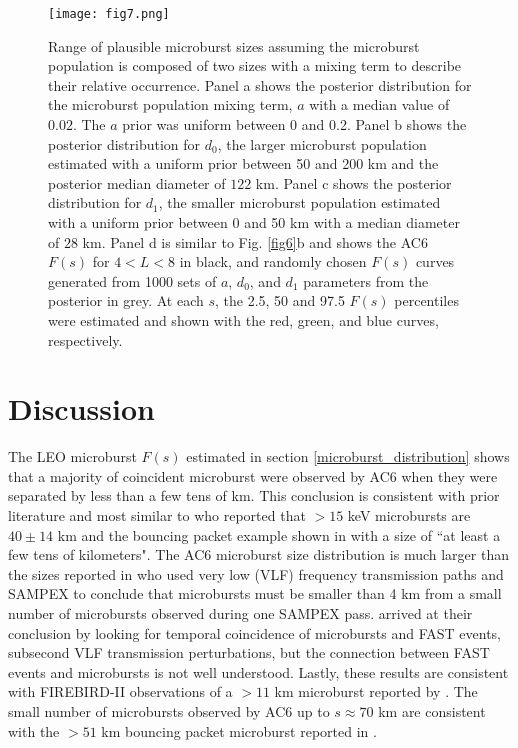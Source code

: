 \documentclass[draft]{agujournal2019}
\begin{document}
\begin{figure}
\texttt{[image: fig7.png]}
\caption{Range of plausible microburst sizes assuming the microburst population is composed of two sizes with a mixing term to describe their relative occurrence. Panel a shows the posterior distribution for the microburst population mixing term, $a$ with a median value of $0.02$. The $a$ prior was uniform between 0 and 0.2. Panel b shows the posterior distribution for $d_0$, the larger microburst population estimated with a uniform prior between 50 and 200 km and the posterior median diameter of $122$ km. Panel c shows the posterior distribution for $d_1$, the smaller microburst population estimated with a uniform prior between 0 and 50 km  with a median diameter of $28$ km. Panel d is similar to Fig. \ref{fig6}b and shows the AC6 $F(s)$ for $4 < L < 8$ in black, and randomly chosen $F(s)$ curves generated from 1000 sets of $a$, $d_0$, and $d_1$ parameters from the posterior in grey. At each $s$, the 2.5, 50 and 97.5 $F(s)$ percentiles were estimated and shown with the red, green, and blue curves, respectively.
} 
\label{fig7}
\end{figure}

\section{Discussion}
The LEO microburst $F(s)$ estimated in section \ref{microburst_distribution} shows that a majority of coincident microburst were observed by AC6 when they were separated by less than a few tens of km. This conclusion is consistent with prior literature and most similar to  who reported that $> 15$ keV microbursts are $40 \pm 14$ km and the bouncing packet example shown in  with a size of ``at least a few tens of kilometers". The AC6 microburst size distribution is much larger than the sizes reported in  who used very low (VLF) frequency transmission paths and SAMPEX to conclude that microbursts must be smaller than 4 km from a small number of microbursts observed during one SAMPEX pass.  arrived at their conclusion by looking for temporal coincidence of microbursts and FAST events, subsecond VLF transmission perturbations, but the connection between FAST events and microbursts is not well understood. Lastly, these results are consistent with FIREBIRD-II observations of a $> 11$ km microburst reported by . The small number of microbursts observed by AC6 up to $s \approx 70$ km are consistent with the $> 51$ km bouncing packet microburst reported in . 
\end{document}
